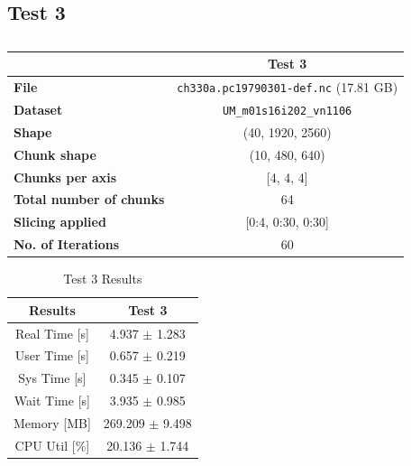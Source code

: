 \documentclass{article}
\begin{document}
\break
\subsection{Test 3}

\begin{table}[h!] 
    \centering 
    \begin{tabular}{lc}  \hline
                                        & Test 3                                          \\ \hline
        \textbf{File}                   & \texttt{ch330a.pc19790301-def.nc} (17.81  GB)   \\  
        \textbf{Dataset}                &  \texttt{UM\_m01s16i202\_vn1106}  \\ 
        \textbf{Shape}                  &  (40, 1920, 2560)                 \\ 
        \textbf{Chunk shape}            &  (10, 480, 640)                   \\ 
        \textbf{Chunks per axis}        &  [4, 4, 4]                        \\ 
        \textbf{Total number of chunks} &  64                               \\ 
        \textbf{Slicing applied}        &  [0:4, 0:30, 0:30]                \\ 
        \textbf{No. of Iterations}      &  60                               \\  \hline
    \end{tabular} 
    \caption{} 
    \label{tab:T3_Conditions} 
\end{table}


\begin{table}[h!]
    \centering
    \begin{tabular}{cc}
        \hline
        \textbf{Results} & Test 3              \\ \hline
        Real Time [s]    &  4.937 $\pm$ 1.283   \\
        User Time [s]    &  0.657 $\pm$ 0.219   \\
        Sys Time [s]     &  0.345 $\pm$ 0.107   \\
        Wait Time [s]    &  3.935 $\pm$ 0.985   \\
        Memory [MB]      &  269.209 $\pm$ 9.498 \\
        CPU Util [\%]    &  20.136 $\pm$ 1.744  \\
        \hline
    \end{tabular}
    \caption{Test 3 Results}
    \label{tab:T3_Results}
\end{table}
\end{document}
